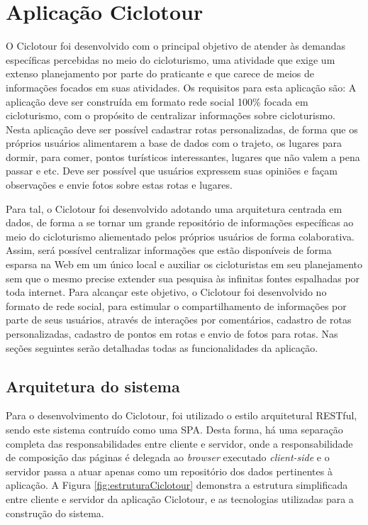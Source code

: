 \section{\esp Aplicação Ciclotour}
O Ciclotour foi desenvolvido com o principal objetivo de atender às demandas específicas percebidas no meio do cicloturismo, uma atividade que exige
um extenso planejamento por parte do praticante e que carece de meios de informações focados em suas atividades. Os requisitos para esta aplicação
são: A aplicação deve ser construída em formato rede social 100\% focada em cicloturismo, com o propósito de centralizar informações sobre 
cicloturismo. Nesta aplicação deve ser possível cadastrar rotas personalizadas, de forma que os próprios usuários alimentarem a base de dados com 
o trajeto, os lugares para dormir, para comer, pontos turísticos interessantes, lugares que não valem a pena passar e etc. Deve ser possível que 
usuários expressem suas opiniões e façam observações e envie fotos sobre estas rotas e lugares.

Para tal, o Ciclotour foi desenvolvido adotando uma arquitetura centrada em dados, de forma a se tornar um grande repositório de informações 
específicas ao meio do cicloturismo aliementado pelos próprios usuários de forma colaborativa. Assim, será possível centralizar informações que 
estão disponíveis de forma esparsa na Web em um único local e auxiliar os cicloturistas em seu planejamento sem que o mesmo precise extender sua 
pesquisa às infinitas fontes espalhadas por toda internet. Para alcançar este objetivo, o Ciclotour foi desenvolvido no formato de rede social, para 
estimular o compartilhamento de informações por parte de seus usuários, através de interações por comentários, cadastro de rotas personalizadas, 
cadastro de pontos em rotas e envio de fotos para rotas. Nas seções seguintes serão detalhadas todas as funcionalidades da aplicação.

\subsection{Arquitetura do sistema}
Para o desenvolvimento do Ciclotour, foi utilizado o estilo arquitetural RESTful, sendo este sistema contruído como uma SPA. Desta forma, há
uma separação completa das responsabilidades entre cliente e servidor, onde a responsabilidade de composição das páginas é delegada ao 
\textit{browser} executado \textit{client-side} e o servidor passa a atuar apenas como um repositório dos dados pertinentes à aplicação. A Figura 
\ref{fig:estruturaCiclotour} demonstra a estrutura simplificada entre cliente e servidor da aplicação Ciclotour, e as tecnologias utilizadas para
a construção do sistema.


